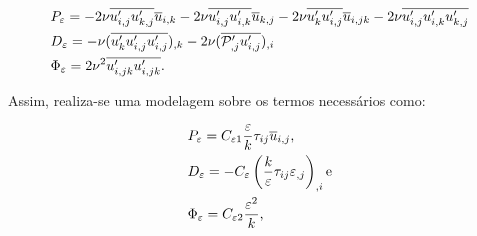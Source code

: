 \documentclass[_ArquivoPrincipal.tex]{subfiles}
\begin{document}
\begin{subequations}
    \begin{align}
         & P_\varepsilon=-2\nu\overline{u'_{i,j}u'_{k,j}}\overline{u}_{i,k}-2\nu\overline{u'_{i,j}u'_{i,k}}\overline{u}_{k,j}-2\nu\overline{u'_ku'_{i,j}}\overline{u}_{i,jk}-2\nu\overline{u'_{i,j}u'_{i,k}u'_{k,j}} \\
         & D_\varepsilon=-\nu(\overline{u'_ku'_{i,j}u'_{i,j}})_{,k}-2\nu(\overline{\mathcal{P}'_{,j}u'_{i,j}})_{,i}                                                                                 \\
         & \Phi_\varepsilon=2\nu^2\overline{u'_{i,jk}u'_{i,jk}}\text{.}
    \end{align}
\end{subequations}

\begin{comment}
Já o tensor de Reynolds pode ser subdividido em duas parcelas: uma parte isotrópica ($\tau_{ij}^I$) e outra desviadora ($\tau_{ij}^D$), ou seja:

\begin{equation}
    \tau_{ij}=\tau_{ij}^I+\tau_{ij}^D\text{,}
\end{equation}

\noindent em que:

\begin{subequations}
    \begin{align}
         & \tau_{ij}^I=-\frac{2}{3}k\delta_{ij}\text{ e} \\
         & \tau_{ij}^D=2\nu_T\epmean_{ij}\text{,}
    \end{align}
\end{subequations}

\noindent $\epmean_{ij}$ é a taxa de deformação do campo de velocidades média:

\begin{equation}
    \epmean_{ij}=\frac{\bar{u}_{i,j}+\bar{u}_{j,i}}{2}
\end{equation}

\noindent e $\nu_T$ é a viscosidade de vórtice.
\end{comment}

Assim, realiza-se uma modelagem sobre os termos necessários como:

\begin{subequations}
    \begin{align}
         & P_\varepsilon=C_{\varepsilon 1}\frac{\varepsilon}{k}\tau_{ij}\overline{u}_{i,j}\text{,}       \\
         & D_\varepsilon=-C_\varepsilon\left({\frac{k}{\varepsilon}\tau_{ij}\varepsilon_{,j}}\right)_{,i}\text{e} \\
         & \Phi_\varepsilon=C_{\varepsilon 2}\frac{\varepsilon^2}{k}\text{,}                        \\
    \end{align}
\end{subequations}
\end{document}
